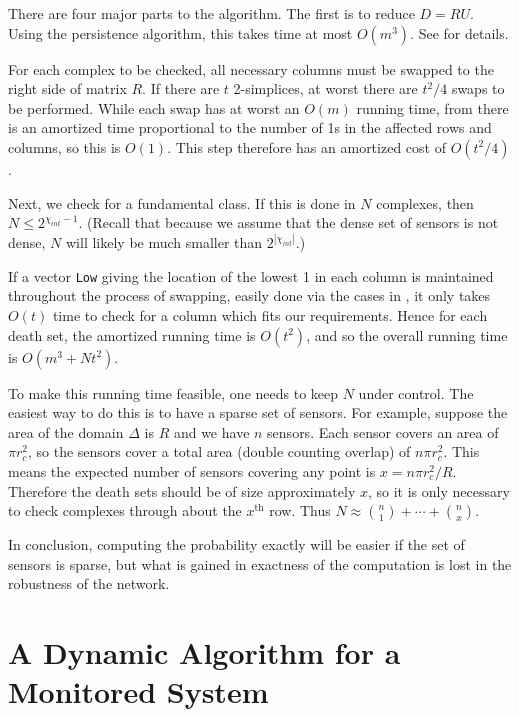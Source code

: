 \documentclass[10pt,twocolumn]{article} \usepackage{amsmath,epsf,amssymb,cite,pifont,amsthm, mathrsfs,epsfig,  bbm, amsthm,  setspace}
\renewcommand{\1}{\mathbbm{1}}
\begin{document}
There are four major parts to the algorithm.
The first is to reduce $D=RU$.
Using the persistence algorithm, this takes time at most $O(m^3)$.
See \cite{Edelsbrunner2010} for details.


For each complex to be checked,  all necessary columns must be swapped to the right side of matrix $R$.
If there are $t$ 2-simplices, at worst there are $t^2/4$ swaps to be performed.
While each swap has at worst an $O(m)$ running time, from \cite{Cohen-Steiner2006}
there is an amortized time proportional to the number of 1s in the affected rows and columns, so this is $O(1)$.
This step therefore has an amortized cost of $O(t^2/4)$.

Next, we check for a fundamental class.
If this is done in $N$ complexes,  then $N \leq 2^{\chi_{int}-1}$.
(Recall that because we assume that the dense set of sensors is not dense, $N$ will likely be much smaller than $2^{|\chi_{int}|}$.)

If  a vector \texttt{Low} giving the location of the lowest 1 in each column is maintained throughout the process of swapping,  easily done via the cases in \cite{Cohen-Steiner2006}, it only takes $O(t)$ time to check for a column which fits our requirements.
Hence for each death set, the amortized running time is $O(t^2)$, and so the overall running time is $O(m^3+Nt^2)$.

To make this running time feasible, one needs to keep $N$ under control.
The easiest way to do this is to have a sparse set of sensors.
For example, suppose the area of the domain $\Delta$ is $R$ and we have $n$ sensors.
Each sensor covers an area of $\pi r_c^2$, so the sensors cover a total area (double counting overlap) of $n\pi r_c^2$.
This means the expected number of sensors covering any point is $x = n\pi r_c^2 / R$.
Therefore the death sets should be of size approximately $x$, so it is only necessary
to check complexes through about the $x^{\textrm{th}}$ row.
Thus $N \approx \binom{n}{1} +\cdots + \binom{n}{x}$.

In conclusion, computing the probability exactly will be easier if the set of sensors is sparse,
but what is gained in exactness of the computation is lost  in the robustness of the network.





\section{A Dynamic Algorithm for a Monitored System}\label{S: Monitored System}
\end{document}
